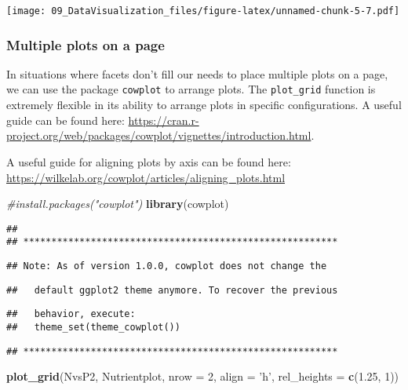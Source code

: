 \documentclass[]{article}
\newenvironment{Shaded}{\begin{snugshade}}{\end{snugshade}}
\newcommand{\CommentTok}[1]{\textcolor[rgb]{0.56,0.35,0.01}{\textit{#1}}}
\newcommand{\DataTypeTok}[1]{\textcolor[rgb]{0.13,0.29,0.53}{#1}}
\newcommand{\DecValTok}[1]{\textcolor[rgb]{0.00,0.00,0.81}{#1}}
\newcommand{\FloatTok}[1]{\textcolor[rgb]{0.00,0.00,0.81}{#1}}
\newcommand{\KeywordTok}[1]{\textcolor[rgb]{0.13,0.29,0.53}{\textbf{#1}}}
\newcommand{\NormalTok}[1]{#1}
\newcommand{\StringTok}[1]{\textcolor[rgb]{0.31,0.60,0.02}{#1}}
\begin{document}
\texttt{[image: 09\_DataVisualization\_files/figure-latex/unnamed-chunk-5-7.pdf]}

\hypertarget{multiple-plots-on-a-page}{%
\subsubsection{Multiple plots on a
page}\label{multiple-plots-on-a-page}}

In situations where facets don't fill our needs to place multiple plots
on a page, we can use the package \texttt{cowplot} to arrange plots. The
\texttt{plot\_grid} function is extremely flexible in its ability to
arrange plots in specific configurations. A useful guide can be found
here:
\url{https://cran.r-project.org/web/packages/cowplot/vignettes/introduction.html}.

A useful guide for aligning plots by axis can be found here:
\url{https://wilkelab.org/cowplot/articles/aligning_plots.html}

\begin{Shaded}
\begin{Highlighting}[]
\CommentTok{#install.packages("cowplot")}
\KeywordTok{library}\NormalTok{(cowplot)}
\end{Highlighting}
\end{Shaded}

\begin{verbatim}
## 
## ********************************************************
\end{verbatim}

\begin{verbatim}
## Note: As of version 1.0.0, cowplot does not change the
\end{verbatim}

\begin{verbatim}
##   default ggplot2 theme anymore. To recover the previous
\end{verbatim}

\begin{verbatim}
##   behavior, execute:
##   theme_set(theme_cowplot())
\end{verbatim}

\begin{verbatim}
## ********************************************************
\end{verbatim}

\begin{Shaded}
\begin{Highlighting}[]
\KeywordTok{plot_grid}\NormalTok{(NvsP2, Nutrientplot, }\DataTypeTok{nrow =} \DecValTok{2}\NormalTok{, }\DataTypeTok{align =} \StringTok{'h'}\NormalTok{, }\DataTypeTok{rel_heights =} \KeywordTok{c}\NormalTok{(}\FloatTok{1.25}\NormalTok{, }\DecValTok{1}\NormalTok{))}
\end{Highlighting}
\end{Shaded}
\end{document}
